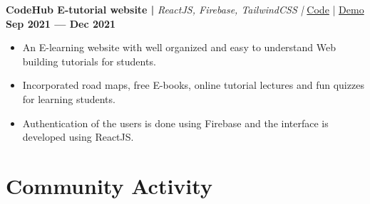\documentclass[a4,10pt]{article}
\newenvironment{zitemize}{
\begin{itemize}\itemsep0pt \parskip0pt \parsep1pt}
{\end{itemize}\vspace{-0.5cm}}
\begin{document}
\vspace{0.35cm}
\textbf{CodeHub E-tutorial website | } \emph{ReactJS, Firebase, TailwindCSS |  }{\href{https://github.com/Harsh-H-Shah/codehub}{
            \color{UI_blue} Code}}
            | 
            {\href{https://code-hub-2021.netlify.app/}{
            \color{UI_blue} Demo} } \textbf{\hfill Sep 2021 --- Dec 2021}
    \vspace{-0.2cm}
    \begin{zitemize}
        \item An E-learning website with well organized and easy to understand Web building tutorials for students.
        \item Incorporated road maps, free E-books, online tutorial lectures and fun quizzes for learning students.
        \item Authentication of the users is done using Firebase and the interface is developed using ReactJS.
    \end{zitemize}
\vspace{-0.25cm}



\section{Community Activity}

\vspace{-0.1cm}
\end{document}
